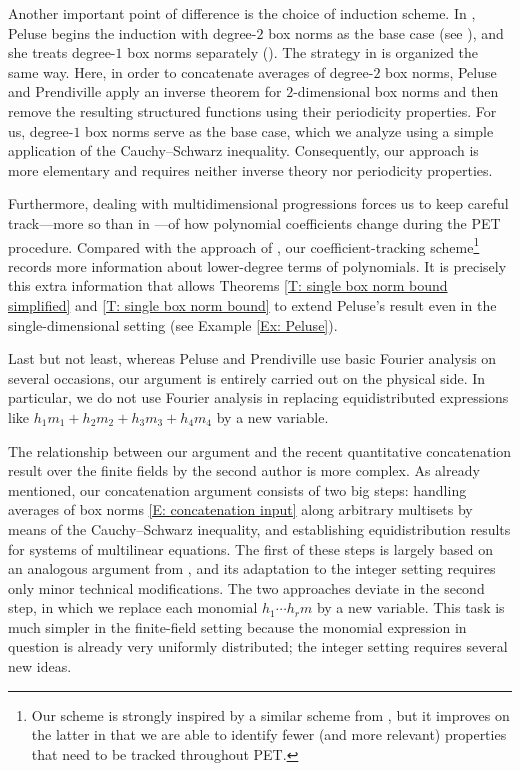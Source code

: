 \documentclass[11pt]{amsart}
\theoremstyle{definition}
\begin{document}
Another important point of difference is the choice of induction scheme.  In \cite{Pel20}, Peluse begins the induction with degree-$2$ box norms as the base case (see \cite[Lemma 5.5]{Pel20}), and she treats degree-$1$ box norms separately (\cite[Lemma 5.4]{Pel20}).  The strategy in \cite{PP19, Pre20b} is organized the same way. 
Here, in order to concatenate averages of degree-$2$ box norms, Peluse and Prendiville apply an inverse theorem for $2$-dimensional box norms and then remove the resulting structured functions using their periodicity properties. For us, degree-$1$ box norms serve as the base case, which we analyze using a simple application of the Cauchy--Schwarz inequality. Consequently, our approach is more elementary and requires neither inverse theory nor periodicity properties.

Furthermore, dealing with multidimensional progressions forces us to keep careful track---more so than in \cite{Pel20}---of how polynomial coefficients change during the PET procedure.  Compared with the approach of \cite{Pel20}, our coefficient-tracking scheme\footnote{Our scheme is strongly inspired by a similar scheme from \cite{DFKS22}, but it improves on the latter in that we are able to identify fewer (and more relevant) properties that need to be tracked throughout PET.} records more information about lower-degree terms of polynomials. It is precisely this extra information that allows Theorems \ref{T: single box norm bound simplified} and \ref{T: single box norm bound} to extend Peluse's result even in the single-dimensional setting (see Example \ref{Ex: Peluse}).

Last but not least, whereas Peluse and Prendiville use basic Fourier analysis on several occasions, our argument is entirely carried out on the physical side. In particular, we do not use Fourier analysis in replacing equidistributed expressions like $h_1 m_1 + h_2 m_2 + h_3 m_3 + h_4 m_4$ by a new variable.

The relationship between our argument and the recent quantitative concatenation result over the finite fields by the second author \cite{Kuc23} is more complex. As already mentioned, our concatenation argument consists of two big steps: handling averages of box norms \eqref{E: concatenation input} along arbitrary multisets by means of the Cauchy--Schwarz inequality, and establishing equidistribution results for systems of multilinear equations. The first of these steps is largely based on an analogous argument from \cite{Kuc23}, and its adaptation to the integer setting requires only minor technical modifications. The two approaches deviate in the second step, in which we replace each monomial $h_1 \cdots h_r m$ by a new variable.  This task is much simpler in the finite-field setting because the  monomial expression in question is already very uniformly distributed; the integer setting requires several new ideas.
 
\end{document}
